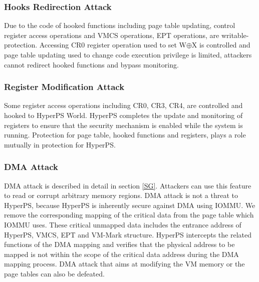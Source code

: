 \documentclass[conference]{IEEEtran}
\begin{document}
\subsubsection{Hooks Redirection Attack}

Due to the code of hooked functions including page table updating, control register access operations and VMCS operations, EPT operations, are writable-protection. Accessing CR0 register operation used to set W$\oplus${X} is controlled and page table updating used to change code execution privilege is limited, attackers cannot redirect hooked functions and bypass monitoring.

\subsubsection{Register Modification Attack}

Some register access operations including CR0, CR3, CR4, are controlled and hooked to HyperPS World. 
HyperPS completes the update and monitoring of registers to ensure that the security mechanism is enabled while the system is running. 
 Protection for page table, hooked functions and registers, plays a role mutually in protection for HyperPS. 

\subsubsection{DMA Attack}

 DMA attack is described in detail in section \ref{SG}. Attackers can use this feature to read or corrupt arbitrary memory regions. DMA attack is not a threat to HyperPS, because HyperPS is inherently secure against DMA using IOMMU. We remove the corresponding mapping of the critical data from the page table which IOMMU uses. These critical unmapped data includes the entrance address of HyperPS, VMCS, EPT and VM-Mark structure. 
HyperPS intercepts the related functions of the DMA mapping and verifies that the physical address to be mapped is not within the scope of the critical data address during the DMA mapping process.
DMA attack that aims at modifying the VM memory or the page tables can also be defeated.

\end{document}
